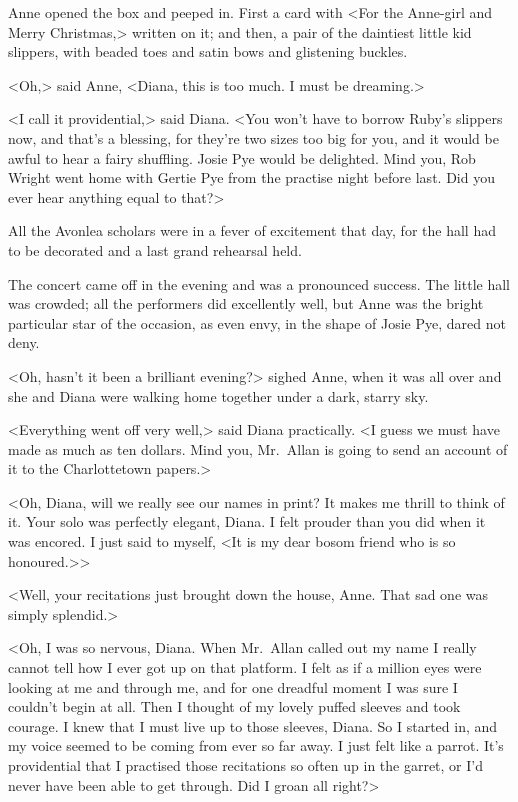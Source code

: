 Anne opened the box and peeped in. First a card with <For the Anne-girl and Merry Christmas,> written on it; and then, a pair of the daintiest little kid slippers, with beaded toes and satin bows and glistening buckles.

<Oh,> said Anne, <Diana, this is too much. I must be dreaming.>

<I call it providential,> said Diana. <You won't have to borrow Ruby's slippers now, and that's a blessing, for they're two sizes too big for you, and it would be awful to hear a fairy shuffling. Josie Pye would be delighted. Mind you, Rob Wright went home with Gertie Pye from the practise night before last. Did you ever hear anything equal to that?>

All the Avonlea scholars were in a fever of excitement that day, for the hall had to be decorated and a last grand rehearsal held.

The concert came off in the evening and was a pronounced success. The little hall was crowded; all the performers did excellently well, but Anne was the bright particular star of the occasion, as even envy, in the shape of Josie Pye, dared not deny.

<Oh, hasn't it been a brilliant evening?> sighed Anne, when it was all over and she and Diana were walking home together under a dark, starry sky.

<Everything went off very well,> said Diana practically. <I guess we must have made as much as ten dollars. Mind you, Mr.~Allan is going to send an account of it to the Charlottetown papers.>

<Oh, Diana, will we really see our names in print? It makes me thrill to think of it. Your solo was perfectly elegant, Diana. I felt prouder than you did when it was encored. I just said to myself, <It is my dear bosom friend who is so honoured.>>

<Well, your recitations just brought down the house, Anne. That sad one was simply splendid.>

<Oh, I was so nervous, Diana. When Mr.~Allan called out my name I really cannot tell how I ever got up on that platform. I felt as if a million eyes were looking at me and through me, and for one dreadful moment I was sure I couldn't begin at all. Then I thought of my lovely puffed sleeves and took courage. I knew that I must live up to those sleeves, Diana. So I started in, and my voice seemed to be coming from ever so far away. I just felt like a parrot. It's providential that I practised those recitations so often up in the garret, or I'd never have been able to get through. Did I groan all right?>

